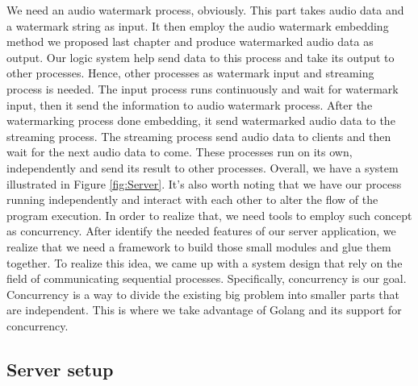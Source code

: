 We need an audio watermark process, obviously. This part takes audio data and a watermark string as input. It then employ the audio watermark embedding method we proposed last chapter and produce watermarked audio data as output. Our logic system help send data to this process and take its output to other processes. Hence, other processes as watermark input and streaming process is needed. The input process runs continuously and wait for watermark input, then it send the information to audio watermark process. After the watermarking process done embedding, it send watermarked audio data to the streaming process. The streaming process send audio data to clients and then wait for the next audio data to come. These processes run on its own, independently and send its result to other processes. Overall, we have a system illustrated in Figure \ref{fig:Server}. It’s also worth noting that we have our process running independently and interact with each other  to alter the flow of the program execution. In order to realize that, we need tools to employ such concept as concurrency. After identify the needed features of our server application, we realize that we need a framework to build those small modules and glue them together. To realize this idea, we came up with a system design that rely on the field of communicating sequential processes. Specifically, concurrency is our goal. Concurrency is a way to divide the existing big problem into smaller parts that are independent. This is where we take advantage of Golang and its support for concurrency.

\subsection{Server setup}

